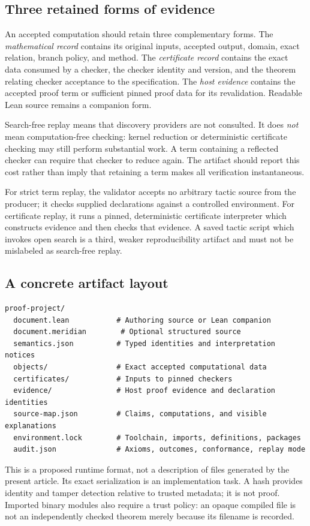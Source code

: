 \documentclass[11pt,a4paper]{article}
\theoremstyle{remark}
\begin{document}
\subsection{Three retained forms of evidence}
An accepted computation should retain three complementary forms.
The \emph{mathematical record} contains its original inputs, accepted output,
domain, exact relation, branch policy, and method. The \emph{certificate record}
contains the exact data consumed by a checker, the checker identity and version,
and the theorem relating checker acceptance to the specification. The
\emph{host evidence} contains the accepted proof term or sufficient pinned
proof data for its revalidation. Readable Lean source remains a companion form.

Search-free replay means that discovery providers are not consulted. It does
\emph{not} mean computation-free checking: kernel reduction or deterministic
certificate checking may still perform substantial work. A term containing a
reflected checker can require that checker to reduce again. The artifact should
report this cost rather than imply that retaining a term makes all verification
instantaneous.

For strict term replay, the validator accepts no arbitrary tactic source from
the producer; it checks supplied declarations against a controlled environment.
For certificate replay, it runs a pinned, deterministic certificate interpreter
which constructs evidence and then checks that evidence. A saved tactic script
which invokes open search is a third, weaker reproducibility artifact and must
not be mislabeled as search-free replay.

\subsection{A concrete artifact layout}
\par\smallskip\noindent\begin{minipage}{\linewidth}
\begin{lstlisting}
proof-project/
  document.lean           # Authoring source or Lean companion
  document.meridian        # Optional structured source
  semantics.json          # Typed identities and interpretation notices
  objects/                # Exact accepted computational data
  certificates/           # Inputs to pinned checkers
  evidence/               # Host proof evidence and declaration identities
  source-map.json         # Claims, computations, and visible explanations
  environment.lock        # Toolchain, imports, definitions, packages
  audit.json              # Axioms, outcomes, conformance, replay mode
\end{lstlisting}
\end{minipage}\par\smallskip
This is a proposed runtime format, not a description of files generated by the
present article. Its exact serialization is an implementation task. A hash
provides identity and tamper detection relative to trusted metadata; it is not
proof. Imported binary modules also require a trust policy: an opaque compiled
file is not an independently checked theorem merely because its filename is
recorded.
\end{document}
